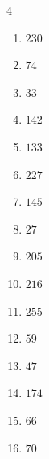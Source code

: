 \begin{multicols}{4}
\begin{enumerate}
  \item $230$


  \item $74$


  \item $33$


  \item $142$


  \item $133$


  \item $227$


  \item $145$


  \item $27$


  \item $205$


  \item $216$


\columnbreak %

  \item $255$


  \item $59$


  \item $47$


  \item $174$


  \item $66$


  \item $70$


\end{enumerate}
\end{multicols}

